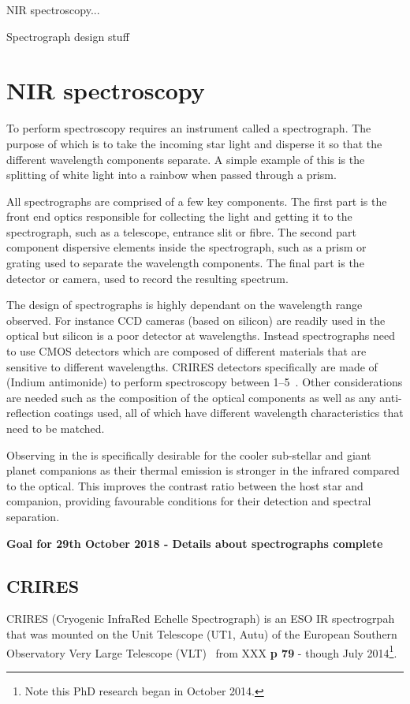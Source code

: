 
NIR spectroscopy...

Spectrograph design stuff


\section{NIR spectroscopy}
To perform spectroscopy requires an instrument called a spectrograph. The purpose of which is to take the incoming star light and disperse it so that the different wavelength components separate. A simple example of this is the splitting of white light into a rainbow when passed through a prism.

All spectrographs are comprised of a few key components.
The first part is the front end optics responsible for collecting the light and getting it to the spectrograph, such as a telescope, entrance slit or fibre.
The second part component dispersive elements inside the spectrograph, such as a prism or grating used to separate the wavelength components.
The final part is the detector or camera, used to record the resulting spectrum.

The design of spectrographs is highly dependant on the wavelength range observed. For instance {CCD} cameras (based on silicon) are readily used in the optical but silicon is a poor detector at \nir{} wavelengths.
Instead \nir{} spectrographs need to use CMOS detectors which are composed of different materials that are sensitive to different wavelengths.
{CRIRES} detectors specifically are made of  (Indium antimonide) to perform spectroscopy between 1--5\um{}~\cite{dorn_crires_2004}.
Other considerations are needed such as the composition of the optical components as well as any anti-reflection coatings used, all of which have different wavelength characteristics that need to be matched.





Observing in the \nir{} is specifically desirable for the cooler sub-stellar and giant planet companions as their thermal emission is stronger in the infrared compared to the optical.
This improves the contrast ratio between the host star and companion, providing favourable conditions for their detection and spectral separation.


\textbf{Goal for 29th October 2018 - Details about spectrographs complete }

\subsection{CRIRES}
CRIRES (Cryogenic InfraRed Echelle Spectrograph) is an ESO IR spectrogrpah that was mounted on the Unit Telescope (UT1, Autu) of the European Southern Observatory Very Large Telescope (VLT)~\citep{kaeufl 2004 } from XXX \textbf{p 79} - though July 2014\footnote{Note this PhD research began in October 2014.}.

